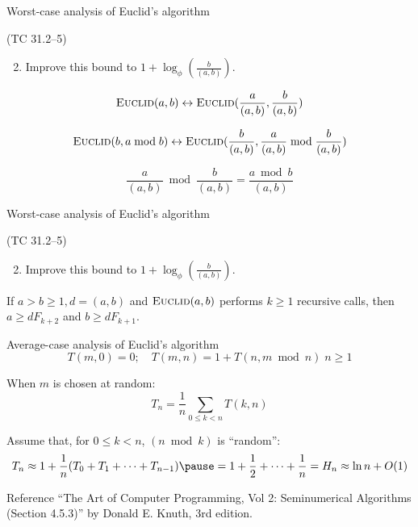 \begin{frame}{Worst-case analysis of Euclid's algorithm}
  \begin{exampleblock}{(TC 31.2--5)}
	\begin{enumerate}
	  \setcounter{enumi}{1}
	  \item Improve this bound to $1 + \log_{\phi}(\frac{b}{(a,b)})$.
	\end{enumerate}
  \end{exampleblock}

  \[
	\textsc{Euclid}(a,b) \leftrightarrow \textsc{Euclid}(\frac{a}{(a,b)}, \frac{b}{(a,b)})
  \]

  \[
	\textsc{Euclid}(b, a \bmod b) \leftrightarrow \textsc{Euclid}(\frac{b}{(a,b)}, \frac{a}{(a,b)} \bmod \frac{b}{(a,b)})
  \]

  \[
	\frac{a}{(a,b)} \bmod \frac{b}{(a,b)} = \frac{a \bmod b}{(a,b)}
  \]
\end{frame}
\begin{frame}{Worst-case analysis of Euclid's algorithm}
  \begin{exampleblock}{(TC 31.2--5)}
	\begin{enumerate}
	  \setcounter{enumi}{1}
	  \item Improve this bound to $1 + \log_{\phi}(\frac{b}{(a,b)})$.
	\end{enumerate}
  \end{exampleblock}

  \begin{Lemma}
	If $a > b \ge 1, d = (a,b)$ and $\textsc{Euclid}(a,b)$ performs $k \ge 1$ recursive calls,
	then $a \ge dF_{k+2}$ and $b \ge dF_{k+1}$.
  \end{Lemma}
\end{frame}
\begin{frame}{Average-case analysis of Euclid's algorithm}
  \[
	T(m,0) = 0; \quad T(m,n) = 1 + T(n, m \bmod n) \; n \ge 1
  \]
  
  \pause
  When $m$ is chosen at random:
  \[
	T_n = \frac{1}{n} \sum_{0 \le k < n} T(k,n)
  \]

  \pause
  Assume that, for $0 \le k < n$, $(n \bmod k)$ is ``random'':
  \[
	T_n \approx 1 + \frac{1}{n} (T_0 + T_1 + \cdots + T_{n-1}) \pause = 1 + \frac{1}{2} + \cdots + \frac{1}{n} = H_n \approx \ln n + O(1)
  \]

  \pause
  \begin{alertblock}{Reference}
	``The Art of Computer Programming, Vol 2: Seminumerical Algorithms (Section 4.5.3)'' by Donald E. Knuth, 3rd edition.
  \end{alertblock}
\end{frame}
